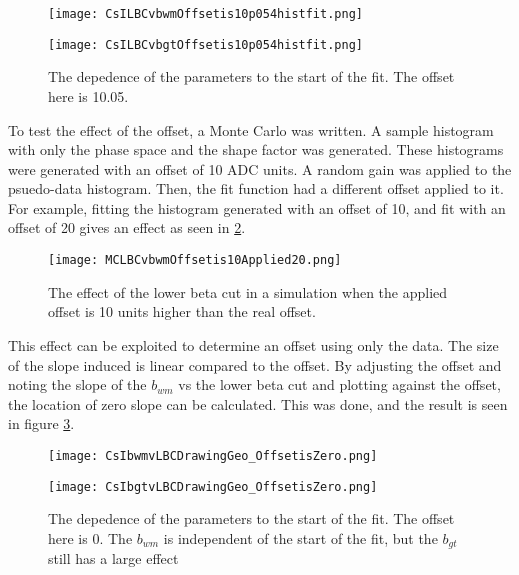 \documentclass[../MaxHughesThesis.tex]{subfiles}
\begin{document}
\begin{figure}
    \centering
    \begin{minipage}{0.50\textwidth}
        \centerline{\texttt{[image: CsILBCvbwmOffsetis10p054histfit.png]}}
    \end{minipage}\hfill
    \begin{minipage}{0.50\textwidth}
        \centerline{\texttt{[image: CsILBCvbgtOffsetis10p054histfit.png]}}
    \end{minipage}
    \caption{The depedence of the parameters to the start of the fit.
	     The offset here is 10.05.}
    \label{fig:offset10LBCeffect}
\end{figure}

To test the effect of the offset, a Monte Carlo was written.
A sample histogram with only the phase space and the shape factor was generated. 
These histograms were generated with an offset of 10 ADC units.
A random gain was applied to the psuedo-data histogram. 
Then, the fit function had a different offset applied to it.
For example, fitting the histogram generated with an offset of 10, and fit with an offset of 20 gives an effect as seen in \ref{fig:MCoffset10applied20}.

\begin{figure}
	\centerline{\texttt{[image: MCLBCvbwmOffsetis10Applied20.png]}}
	\caption{The effect of the lower beta cut in a simulation when the applied offset is 10 units higher than the real offset.}
	\label{fig:MCoffset10applied20}
\end{figure}

This effect can be exploited to determine an offset using only the data. 
The size of the slope induced is linear compared to the offset.
By adjusting the offset and noting the slope of the $b_{wm}$ vs the lower beta cut and plotting against the offset, the location of zero slope can be calculated.
This was done, and the result is seen in figure \ref{fig:offset0LBCeffect}.

\begin{figure}
    \centering
    \begin{minipage}{0.50\textwidth}
        \centerline{\texttt{[image: CsIbwmvLBCDrawingGeo\_OffsetisZero.png]}}
    \end{minipage}\hfill
    \begin{minipage}{0.50\textwidth}
        \centerline{\texttt{[image: CsIbgtvLBCDrawingGeo\_OffsetisZero.png]}}
    \end{minipage}
    \caption{The depedence of the parameters to the start of the fit.
	     The offset here is 0.
	     The $b_{wm}$ is independent of the start of the fit, but the $b_{gt}$ still has a large effect}
    \label{fig:offset0LBCeffect}
\end{figure}
\end{document}
